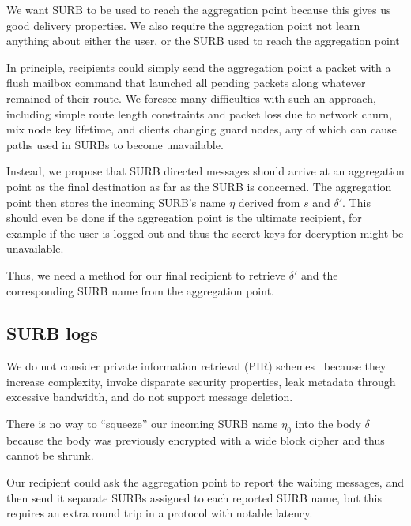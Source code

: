 We want SURB to be used to reach the aggregation point because
this gives us good delivery properties.  We also require the
aggregation point not learn anything about either the user, or
the SURB used to reach the aggregation point

In principle, recipients could simply send the aggregation point
a packet with a flush mailbox command that launched all pending
packets along whatever remained of their route.  We foresee many
difficulties with such an approach, including simple route length
constraints and packet loss due to network churn, mix node key
lifetime, and clients changing guard nodes, any of which can cause
paths used in SURBs to become unavailable.

Instead, we propose that SURB directed messages should arrive at
an aggregation point as the final destination as far as the SURB
is concerned. The aggregation point then stores  the incoming SURB's
name $\eta$ derived from $s$ and $\delta'$.
This should even be done if the aggregation point is the ultimate
recipient, for example if the user is logged out and thus the
secret keys for decryption might be unavailable.  

Thus, we need a method for our final recipient to retrieve
$\delta'$ and the corresponding SURB name from the aggregation point.


\subsection{SURB logs}\label{subsec:surb_logs}

We do not consider private information retrieval (PIR)
schemes~\cite{pir} because they increase complexity, invoke disparate
security properties, leak metadata through excessive bandwidth, and do
not support message deletion.

There is no way to ``squeeze'' our incoming SURB name $\eta_0$ into
the body $\delta$ because the body was previously encrypted with a
wide block cipher and thus cannot be shrunk.

Our recipient could ask the aggregation point to report the waiting
messages, and then send it separate SURBs assigned to each reported
SURB name, but this requires an extra round trip in a protocol with
notable latency. 

